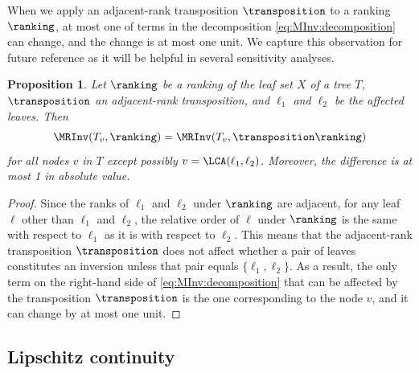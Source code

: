 \documentclass[11pt]{article}
\numberwithin{equation}{section}
\newtheorem{proposition}[theorem]{Proposition}
\theoremstyle{definition}
\theoremstyle{plain}
\begin{document}
When we apply an adjacent-rank transposition $\transposition$ to a ranking $\ranking$, at most one of terms in the decomposition \eqref{eq:MInv:decomposition} can change, and the change is at most one unit. We capture this observation for future reference
as it will be helpful in several sensitivity analyses.
\begin{proposition}\label{prop:change}
Let $\ranking$ be a ranking of the leaf set $X$ of a tree $T$, $\transposition$ an adjacent-rank transposition, and $\ell_1$ and $\ell_2$ be the affected leaves. Then
\[ \MRInv(T_v,\ranking) = \MRInv(T_v,\transposition \ranking) \]
for all nodes $v$ in $T$ except possibly $v = \LCA(\ell_1,\ell_2)$. Moreover, the difference is at most 1 in absolute value.
\end{proposition}
\begin{proof}
Since the ranks of $\ell_1$ and $\ell_2$ under $\ranking$ are adjacent, for any leaf $\ell$ other than $\ell_1$ and $\ell_2$, the relative order of $\ell$ under $\ranking$ is the same with respect to $\ell_1$ as it is with respect to $\ell_2$. This means that the adjacent-rank transposition $\transposition$ does not affect whether a pair of leaves constitutes an inversion unless that pair equals $\{\ell_1,\ell_2\}$. As a result, the only term on the right-hand side of \eqref{eq:MInv:decomposition} that can be affected by the transposition $\transposition$ is the one corresponding to the node $v$, and it can change by at most one unit.
\end{proof}

\subsection{Lipschitz continuity}
\label{sec:lipschitz}
\end{document}
